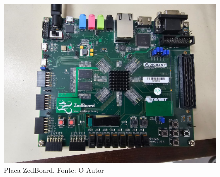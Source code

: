 \begin{figure}[H]
    \centering
    \includegraphics[scale=0.2]{figures/Metodologia/ZedBoard1.jpeg}
    \caption{Placa ZedBoard. Fonte: O Autor}
    \label{fig:ZedBoard}
\end{figure}


